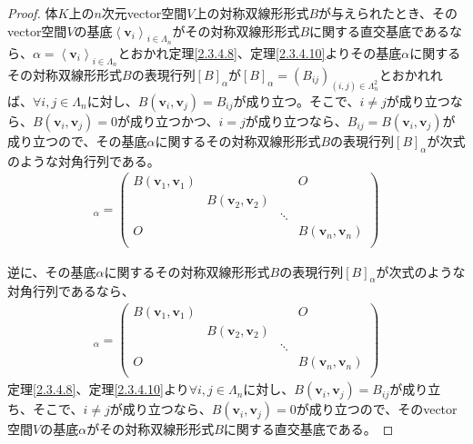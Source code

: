 \documentclass[dvipdfmx]{jsarticle}
\begin{document}
\begin{proof}
体$K$上の$n$次元vector空間$V$上の対称双線形形式$B$が与えられたとき、そのvector空間$V$の基底$\left\langle \mathbf{v}_{i} \right\rangle_{i \in \varLambda_{n}}$がその対称双線形形式$B$に関する直交基底であるなら、$\alpha = \left\langle \mathbf{v}_{i} \right\rangle_{i \in \varLambda_{n}}$とおかれ定理\ref{2.3.4.8}、定理\ref{2.3.4.10}よりその基底$\alpha$に関するその対称双線形形式$B$の表現行列$[ B]_{\alpha}$が$[ B]_{\alpha} = \left( B_{ij} \right)_{(i,j) \in \varLambda_{n}^{2}}$とおかれれば、$\forall i,j \in \varLambda_{n}$に対し、$B\left( \mathbf{v}_{i},\mathbf{v}_{j} \right) = B_{ij}$が成り立つ。そこで、$i \neq j$が成り立つなら、$B\left( \mathbf{v}_{i},\mathbf{v}_{j} \right) = 0$が成り立つかつ、$i = j$が成り立つなら、$B_{ij} = B\left( \mathbf{v}_{i},\mathbf{v}_{j} \right)$が成り立つので、その基底$\alpha$に関するその対称双線形形式$B$の表現行列$[ B]_{\alpha}$が次式のような対角行列である。
\begin{align*}
[ B]_{\alpha} = \begin{pmatrix}
B\left( \mathbf{v}_{1},\mathbf{v}_{1} \right) & \  & \  & O \\
\  & B\left( \mathbf{v}_{2},\mathbf{v}_{2} \right) & \  & \  \\
\  & \  & \ddots & \  \\
O & \  & \  & B\left( \mathbf{v}_{n},\mathbf{v}_{n} \right) \\
\end{pmatrix}
\end{align*}\par
逆に、その基底$\alpha$に関するその対称双線形形式$B$の表現行列$[ B]_{\alpha}$が次式のような対角行列であるなら、
\begin{align*}
[ B]_{\alpha} = \begin{pmatrix}
B\left( \mathbf{v}_{1},\mathbf{v}_{1} \right) & \  & \  & O \\
\  & B\left( \mathbf{v}_{2},\mathbf{v}_{2} \right) & \  & \  \\
\  & \  & \ddots & \  \\
O & \  & \  & B\left( \mathbf{v}_{n},\mathbf{v}_{n} \right) \\
\end{pmatrix}
\end{align*}
定理\ref{2.3.4.8}、定理\ref{2.3.4.10}より$\forall i,j \in \varLambda_{n}$に対し、$B\left( \mathbf{v}_{i},\mathbf{v}_{j} \right) = B_{ij}$が成り立ち、そこで、$i \neq j$が成り立つなら、$B\left( \mathbf{v}_{i},\mathbf{v}_{j} \right) = 0$が成り立つので、そのvector空間$V$の基底$\alpha$がその対称双線形形式$B$に関する直交基底である。
\end{proof}
\end{document}
